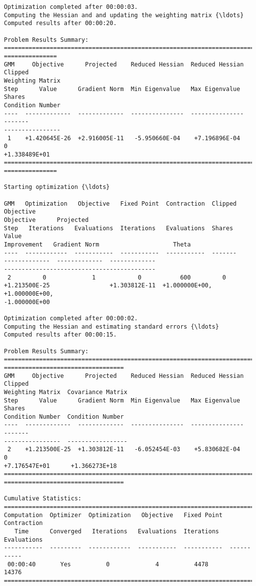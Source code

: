 \begin{Verbatim}[commandchars=\\\{\}]
Optimization completed after 00:00:03.
Computing the Hessian and and updating the weighting matrix {\ldots}
Computed results after 00:00:20.

Problem Results Summary:
================================================================================
===============
GMM     Objective      Projected    Reduced Hessian  Reduced Hessian  Clipped
Weighting Matrix
Step      Value      Gradient Norm  Min Eigenvalue   Max Eigenvalue   Shares
Condition Number
----  -------------  -------------  ---------------  ---------------  -------
----------------
 1    +1.420645E-26  +2.916005E-11   -5.950660E-04    +7.196896E-04      0
+1.338489E+01
================================================================================
===============

Starting optimization {\ldots}

GMM   Optimization   Objective   Fixed Point  Contraction  Clipped    Objective
Objective      Projected
Step   Iterations   Evaluations  Iterations   Evaluations  Shares       Value
Improvement   Gradient Norm                     Theta
----  ------------  -----------  -----------  -----------  -------
-------------  -------------  -------------
-------------------------------------------
 2         0             1            0           600         0
+1.213500E-25                 +1.303812E-11  +1.000000E+00, +1.000000E+00,
-1.000000E+00

Optimization completed after 00:00:02.
Computing the Hessian and estimating standard errors {\ldots}
Computed results after 00:00:15.

Problem Results Summary:
================================================================================
==================================
GMM     Objective      Projected    Reduced Hessian  Reduced Hessian  Clipped
Weighting Matrix  Covariance Matrix
Step      Value      Gradient Norm  Min Eigenvalue   Max Eigenvalue   Shares
Condition Number  Condition Number
----  -------------  -------------  ---------------  ---------------  -------
----------------  -----------------
 2    +1.213500E-25  +1.303812E-11   -6.052454E-03    +5.830682E-04      0
+7.176547E+01      +1.366273E+18
================================================================================
==================================

Cumulative Statistics:
===========================================================================
Computation  Optimizer  Optimization   Objective   Fixed Point  Contraction
   Time      Converged   Iterations   Evaluations  Iterations   Evaluations
-----------  ---------  ------------  -----------  -----------  -----------
 00:00:40       Yes          0             4          4478         14376
===========================================================================


\end{Verbatim}
